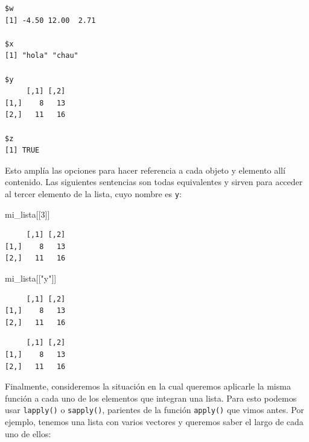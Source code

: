 \documentclass[
]{book}
\newenvironment{Shaded}{\begin{snugshade}}{\end{snugshade}}
\newcommand{\DecValTok}[1]{\textcolor[rgb]{0.00,0.00,0.81}{#1}}
\newcommand{\NormalTok}[1]{#1}
\newcommand{\SpecialCharTok}[1]{\textcolor[rgb]{0.00,0.00,0.00}{#1}}
\newcommand{\StringTok}[1]{\textcolor[rgb]{0.31,0.60,0.02}{#1}}
\begin{document}
\begin{verbatim}
$w
[1] -4.50 12.00  2.71

$x
[1] "hola" "chau"

$y
     [,1] [,2]
[1,]    8   13
[2,]   11   16

$z
[1] TRUE
\end{verbatim}

Esto amplía las opciones para hacer referencia a cada objeto y elemento allí contenido. Las siguientes sentencias son todas equivalentes y sirven para acceder al tercer elemento de la lista, cuyo nombre es \texttt{y}:

\begin{Shaded}
\begin{Highlighting}[]
\NormalTok{mi\_lista[[}\DecValTok{3}\NormalTok{]]}
\end{Highlighting}
\end{Shaded}

\begin{verbatim}
     [,1] [,2]
[1,]    8   13
[2,]   11   16
\end{verbatim}

\begin{Shaded}
\begin{Highlighting}[]
\NormalTok{mi\_lista[[}\StringTok{"y"}\NormalTok{]]}
\end{Highlighting}
\end{Shaded}

\begin{verbatim}
     [,1] [,2]
[1,]    8   13
[2,]   11   16
\end{verbatim}

\begin{Shaded}
\end{Shaded}

\begin{verbatim}
     [,1] [,2]
[1,]    8   13
[2,]   11   16
\end{verbatim}

Finalmente, consideremos la situación en la cual queremos aplicarle la misma función a cada uno de los elementos que integran una lista. Para esto podemos usar \texttt{lapply()} o \texttt{sapply()}, parientes de la función \texttt{apply()} que vimos antes. Por ejemplo, tenemos una lista con varios vectores y queremos saber el largo de cada uno de ellos:
\end{document}
